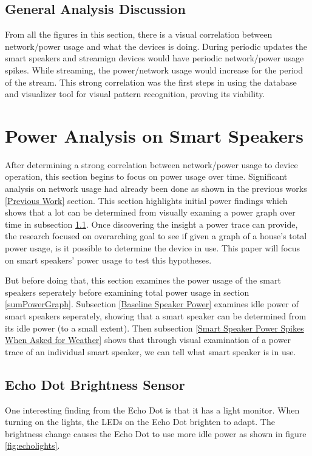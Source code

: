 \subsection{General Analysis Discussion}
From all the figures in this section, there is a visual correlation between network/power usage and what the devices is doing. During periodic updates the smart speakers and streamign devices would have periodic network/power usage spikes. While streaming, the power/network usage would increase for the period of the stream. This strong correlation was the first steps in using the database and visualizer tool for visual pattern recognition, proving its viability.

\section{Power Analysis on Smart Speakers}

After determining a strong correlation between network/power usage to device operation, this section begins to focus on power usage over time. Significant analysis on network usage had already been done as shown in the previous works \ref{Previous Work} section. This section highlights initial power findings which shows that a lot can be determined from visually examing a power graph over time in subsection \ref{Echo Dot Brightness Sensor}. Once discovering the insight a power trace can provide, the research focused on overarching goal to see if given a graph of a house's total power usage, is it possible to determine the device in use. This paper will focus on smart speakers' power usage to test this hypotheses.

But before doing that, this section examines the power usage of the smart speakers seperately before examining total power usage in section \ref{sumPowerGraph}. Subsection \ref{Baseline Speaker Power} examines idle power of smart speakers seperately, showing that a smart speaker can be determined from its idle power (to a small extent). Then subsection \ref{Smart Speaker Power Spikes When Asked for Weather} shows that through visual examination of a power trace of an individual smart speaker, we can tell what smart speaker is in use.

\subsection{Echo Dot Brightness Sensor}
\label{Echo Dot Brightness Sensor}
One interesting finding from the Echo Dot is that it has a light monitor. When turning on the lights, the LEDs on the Echo Dot brighten to adapt. The brightness change causes the Echo Dot to use more idle power as shown in figure \ref{fig:echolights}.

